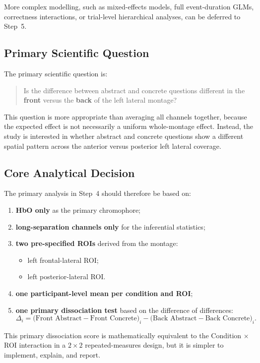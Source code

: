 \documentclass[11pt]{article}
\begin{document}
More complex modelling, such as mixed-effects models, full event-duration GLMs, correctness interactions,
or trial-level hierarchical analyses, can be deferred to Step~5.

\subsection{Primary Scientific Question}
The primary scientific question is:
\begin{quote}
Is the difference between abstract and concrete questions different in the \textbf{front} versus the
\textbf{back} of the left lateral montage?
\end{quote}

This question is more appropriate than averaging all channels together, because the expected effect is
not necessarily a uniform whole-montage effect.
Instead, the study is interested in whether abstract and concrete questions show a different spatial
pattern across the anterior versus posterior left lateral coverage.

\subsection{Core Analytical Decision}
The primary analysis in Step~4 should therefore be based on:
\begin{enumerate}
    \item \textbf{HbO only} as the primary chromophore;
    \item \textbf{long-separation channels only} for the inferential statistics;
    \item \textbf{two pre-specified ROIs} derived from the montage:
    \begin{itemize}
        \item left frontal-lateral ROI;
        \item left posterior-lateral ROI.
    \end{itemize}
    \item \textbf{one participant-level mean per condition and ROI};
    \item \textbf{one primary dissociation test} based on the difference of differences:
    \[
    \Delta_i =
    \bigl(\text{Front Abstract} - \text{Front Concrete}\bigr)_i
    -
    \bigl(\text{Back Abstract} - \text{Back Concrete}\bigr)_i.
    \]
\end{enumerate}

This primary dissociation score is mathematically equivalent to the
Condition $\times$ ROI interaction in a \(2 \times 2\) repeated-measures design,
but it is simpler to implement, explain, and report.
\end{document}
